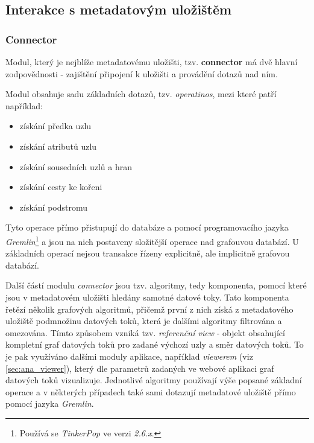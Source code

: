 
\subsection{Interakce s metadatovým uložištěm}
\label{sec:ana_interactions}

\subsubsection{Connector}
\label{sec:ana_connector}
Modul, který je nejblíže metadatovému uložišti, tzv. \textbf{connector} má dvě hlavní zodpovědnosti - zajištění připojení k uložišti a provádění dotazů nad ním. 

Modul obsahuje sadu základních dotazů, tzv. \textit{operatinos}, mezi které patří například: 
\begin{itemize}
	\item{získání předka uzlu}
	\item{získání atributů uzlu}
	\item{získání sousedních uzlů a hran}
	\item{získání cesty ke kořeni}
	\item{získání podstromu}
\end{itemize} 
Tyto operace přímo přistupují do databáze a pomocí programovacího jazyka \textit{Gremlin}\footnote{Používá se \textit{TinkerPop} ve verzi \textit{2.6.x}.} a jsou na nich postaveny složitější operace nad grafouvou databází. U základních operací nejsou transakce řízeny explicitně, ale implicitně grafovou databází.

Další částí modulu \textit{connector} jsou tzv. algoritmy, tedy komponenta, pomocí které jsou v metadatovém uložišti hledány samotné datové toky. Tato komponenta řetězí několik grafových algoritmů, přičemž první z nich získá z metadatového uložiště podmnožinu datových toků, která je dalšími algoritmy filtrována a omezována. Tímto způsobem vzniká tzv. \textit{referenční view} - objekt obsahující kompletní graf datových toků pro zadané výchozí uzly a směr datových toků. To je pak využíváno dalšími moduly aplikace, například \textit{viewerem} (viz \ref{sec:ana_viewer}), který dle parametrů zadaných ve webové aplikaci graf datových toků vizualizuje.   
Jednotlivé algoritmy používají výše popsané základní operace a v některých případech také sami dotazují metadatové uložiště přímo pomocí jazyka \textit{Gremlin}. 

